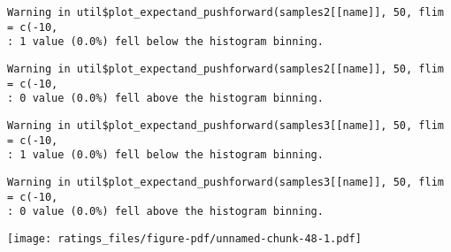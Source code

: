 \documentclass[
  letterpaper,
  DIV=11,
  numbers=noendperiod]{scrartcl}
\newenvironment{Shaded}{\begin{snugshade}}{\end{snugshade}}
\newcommand{\AttributeTok}[1]{\textcolor[rgb]{0.40,0.45,0.13}{#1}}
\newcommand{\ConstantTok}[1]{\textcolor[rgb]{0.56,0.35,0.01}{#1}}
\newcommand{\DecValTok}[1]{\textcolor[rgb]{0.68,0.00,0.00}{#1}}
\newcommand{\FunctionTok}[1]{\textcolor[rgb]{0.28,0.35,0.67}{#1}}
\newcommand{\NormalTok}[1]{\textcolor[rgb]{0.00,0.23,0.31}{#1}}
\newcommand{\OtherTok}[1]{\textcolor[rgb]{0.00,0.23,0.31}{#1}}
\newcommand{\SpecialCharTok}[1]{\textcolor[rgb]{0.37,0.37,0.37}{#1}}
\newcommand{\StringTok}[1]{\textcolor[rgb]{0.13,0.47,0.30}{#1}}
\begin{document}
\begin{Shaded}
\end{Shaded}

\begin{verbatim}
Warning in util$plot_expectand_pushforward(samples2[[name]], 50, flim = c(-10,
: 1 value (0.0%) fell below the histogram binning.
\end{verbatim}

\begin{verbatim}
Warning in util$plot_expectand_pushforward(samples2[[name]], 50, flim = c(-10,
: 0 value (0.0%) fell above the histogram binning.
\end{verbatim}

\begin{verbatim}
Warning in util$plot_expectand_pushforward(samples3[[name]], 50, flim = c(-10,
: 1 value (0.0%) fell below the histogram binning.
\end{verbatim}

\begin{verbatim}
Warning in util$plot_expectand_pushforward(samples3[[name]], 50, flim = c(-10,
: 0 value (0.0%) fell above the histogram binning.
\end{verbatim}

\texttt{[image: ratings\_files/figure-pdf/unnamed-chunk-48-1.pdf]}
\end{document}
